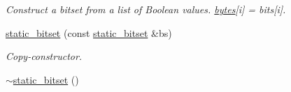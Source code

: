 \begin{DoxyCompactItemize}
\begin{DoxyCompactList}\small\item\em Construct a bitset from a list of Boolean values. \hyperlink{classlgraph_1_1utils_1_1static__bitset_a56d277fc22bbf71a27fca530a133c9bd}{bytes}\mbox{[}i\mbox{]} = {\itshape bits}\mbox{[}i\mbox{]}. \end{DoxyCompactList}\item 
\hypertarget{classlgraph_1_1utils_1_1static__bitset_a683aec1377830f07c5d5f53f969be569}{\hyperlink{classlgraph_1_1utils_1_1static__bitset_a683aec1377830f07c5d5f53f969be569}{static\-\_\-bitset} (const \hyperlink{classlgraph_1_1utils_1_1static__bitset}{static\-\_\-bitset} \&bs)}\label{classlgraph_1_1utils_1_1static__bitset_a683aec1377830f07c5d5f53f969be569}

\begin{DoxyCompactList}\small\item\em Copy-\/constructor. \end{DoxyCompactList}\item 
\hypertarget{classlgraph_1_1utils_1_1static__bitset_aabbb46d8283fffa38b39204b204999be}{\hyperlink{classlgraph_1_1utils_1_1static__bitset_aabbb46d8283fffa38b39204b204999be}{$\sim$static\-\_\-bitset} ()}\label{classlgraph_1_1utils_1_1static__bitset_aabbb46d8283fffa38b39204b204999be}


\end{DoxyCompactItemize}
